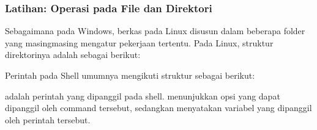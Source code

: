 \documentclass[letterpaper,10pt,english]{sphinxmanual}
\begin{document}
\subsubsection{Latihan: Operasi pada File dan Direktori}
\label{\detokenize{sesi1/arsitektur:latihan-operasi-pada-file-dan-direktori}}
Sebagaimana pada Windows, berkas pada Linux disusun dalam beberapa folder yang masing\sphinxhyphen{}masing mengatur pekerjaan tertentu. Pada Linux, struktur direktorinya adalah sebagai berikut:


Perintah pada Shell umumnya mengikuti struktur sebagai berikut:


 adalah perintah yang dipanggil pada shell.  menunjukkan opsi yang dapat dipanggil oleh command tersebut, sedangkan  menyatakan variabel yang dipanggil oleh perintah tersebut.
\end{document}
